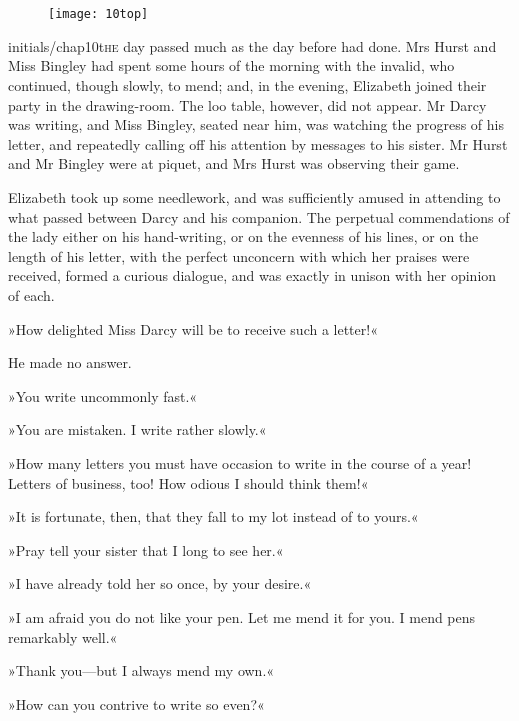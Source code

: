\chapter[Chapter \thechapter]{}
\begin{figure}[t!]
\centering
\texttt{[image: 10top]}
\end{figure}

\lettrine[lines=6,image=true]{initials/chap10t}{he}  day passed much as the day before had done. Mrs Hurst and Miss Bingley had spent some hours of the morning with the invalid, who continued, though slowly, to mend; and, in the evening, Elizabeth joined their party in the drawing-room. The loo table, however, did not appear. Mr Darcy was writing, and Miss Bingley, seated near him, was watching the progress of his letter, and repeatedly calling off his attention by messages to his sister. Mr Hurst and Mr Bingley were at piquet, and Mrs Hurst was observing their game.

Elizabeth took up some needlework, and was sufficiently amused in attending to what passed between Darcy and his companion. The perpetual commendations of the lady either on his hand-writing, or on the evenness of his lines, or on the length of his letter, with the perfect unconcern with which her praises were received, formed a curious dialogue, and was exactly in unison with her opinion of each.

»How delighted Miss Darcy will be to receive such a letter!«

He made no answer.

»You write uncommonly fast.«

»You are mistaken. I write rather slowly.«

»How many letters you must have occasion to write in the course of a year! Letters of business, too! How odious I should think them!«

»It is fortunate, then, that they fall to my lot instead of to yours.«

»Pray tell your sister that I long to see her.«

»I have already told her so once, by your desire.«

»I am afraid you do not like your pen. Let me mend it for you. I mend pens remarkably well.«

»Thank you—but I always mend my own.«

»How can you contrive to write so even?«

